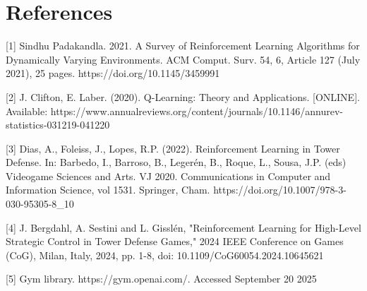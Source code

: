 \documentclass[12pt]{article}
\begin{document}
\section*{References}

[1] Sindhu Padakandla. 2021. A Survey of Reinforcement Learning Algorithms for Dynamically Varying Environments. ACM Comput. Surv. 54, 6, Article 127 (July 2021), 25 pages.
https://doi.org/10.1145/3459991 \par

[2] J. Clifton, E. Laber. (2020). Q-Learning: Theory and Applications. [ONLINE]. Available: https://www.annualreviews.org/content/journals/10.1146/annurev-statistics-031219-041220 \par

[3] Dias, A., Foleiss, J., Lopes, R.P. (2022). Reinforcement Learning in Tower Defense. In: Barbedo, I., Barroso, B., Legerén, B., Roque, L., Sousa, J.P. (eds) Videogame Sciences and Arts. VJ 2020. Communications in Computer and Information Science, vol 1531. Springer, Cham. https://doi.org/10.1007/978-3-030-95305-8\_10 \par 

[4] J. Bergdahl, A. Sestini and L. Gisslén, "Reinforcement Learning for High-Level Strategic Control in Tower Defense Games," 2024 IEEE Conference on Games (CoG), Milan, Italy, 2024, pp. 1-8, doi: 10.1109/CoG60054.2024.10645621 \par

[5] Gym library. https://gym.openai.com/. Accessed September 20 2025
\end{document}
